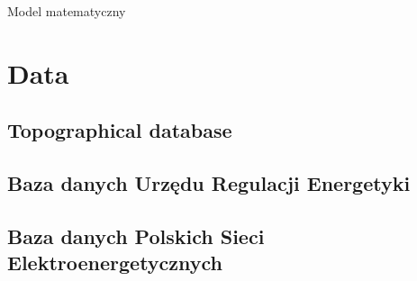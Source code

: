 Model matematyczny \cite{mod-agentowe}

\section{Data}

\subsection{Topographical database}

\subsection{Baza danych Urzędu Regulacji Energetyki}

\subsection{Baza danych Polskich Sieci Elektroenergetycznych}

\section{}